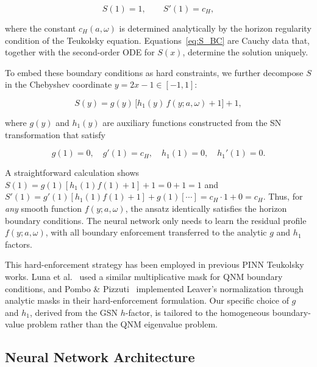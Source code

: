 \documentclass[aps,prd,twocolumn,superscriptaddress,nofootinbib]{revtex4-2}
\begin{document}
\begin{equation}\label{eq:S_BC}
  S(1) = 1, \qquad S'(1) = c_H,
\end{equation}

where the constant $c_H(a,\omega)$ is determined analytically by the horizon
regularity condition of the Teukolsky equation.  Equations~\eqref{eq:S_BC} are
Cauchy data that, together with the second-order ODE for $S(x)$, determine the
solution uniquely.

To embed these boundary conditions as hard constraints, we further decompose
$S$ in the Chebyshev coordinate $y = 2x - 1 \in [-1, 1]$:

\begin{equation}\label{eq:S_ansatz}
  S(y) = g(y)\, \big[ h_1(y)\, f(y; a,\omega) + 1 \big] + 1,
\end{equation}

where $g(y)$ and $h_1(y)$ are auxiliary functions constructed from the SN
transformation that satisfy

\begin{equation}
  g(1) = 0,\quad g'(1) = c_H,\quad h_1(1) = 0,\quad h_1'(1) = 0.
\end{equation}

A straightforward calculation shows $S(1) = g(1)[h_1(1)f(1) + 1] + 1 = 0 + 1
= 1$ and $S'(1) = g'(1)[h_1(1)f(1) + 1] + g(1)[\cdots] = c_H \cdot 1 + 0 =
c_H$.  Thus, for \emph{any} smooth function $f(y; a,\omega)$, the ansatz
identically satisfies the horizon boundary conditions.  The neural network
only needs to learn the residual profile $f(y; a,\omega)$, with all boundary
enforcement transferred to the analytic $g$ and $h_1$ factors.

This hard-enforcement strategy has been employed in previous PINN Teukolsky
works.  Luna et al.~\cite{Luna:2022pinn} used a similar multiplicative mask for
QNM boundary conditions, and Pombo \& Pizzuti~\cite{Pombo:2025tbyd} implemented
Leaver's normalization through analytic masks in their hard-enforcement
formulation.  Our specific choice of $g$ and $h_1$, derived from the GSN
$h$-factor, is tailored to the homogeneous boundary-value problem rather than
the QNM eigenvalue problem.

\subsection{Neural Network Architecture}
\label{sec:architecture}
\end{document}
